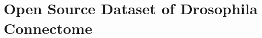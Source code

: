 \documentclass[../main.tex]{subfiles}
\begin{document}
\section{Open Source Dataset of Drosophila Connectome}
\end{document}
